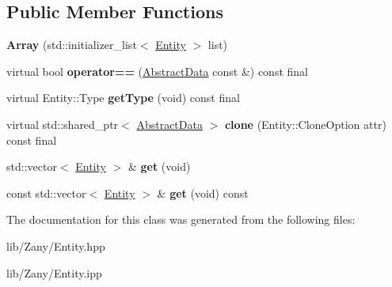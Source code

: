 \subsection*{Public Member Functions}
\begin{DoxyCompactItemize}
\item 
\mbox{\label{classzany_1_1_array_a212f89a1e77b6822880a61e0154e9821}} 
{\bfseries Array} (std\+::initializer\+\_\+list$<$ \hyperlink{classzany_1_1_entity}{Entity} $>$ list)
\item 
\mbox{\label{classzany_1_1_array_a0dc13166b5668856e8133b11ea801204}} 
virtual bool {\bfseries operator==} (\hyperlink{classzany_1_1_abstract_data}{Abstract\+Data} const \&) const final
\item 
\mbox{\label{classzany_1_1_array_a5e28b4da092baae2bd8ecb611e379110}} 
virtual Entity\+::\+Type {\bfseries get\+Type} (void) const final
\item 
\mbox{\label{classzany_1_1_array_a39a6b3fed75600f400d73bba1c2fbed5}} 
virtual std\+::shared\+\_\+ptr$<$ \hyperlink{classzany_1_1_abstract_data}{Abstract\+Data} $>$ {\bfseries clone} (Entity\+::\+Clone\+Option attr) const final
\item 
\mbox{\label{classzany_1_1_array_a9a3620cc53ae2270dc9883dc3ef566d2}} 
std\+::vector$<$ \hyperlink{classzany_1_1_entity}{Entity} $>$ \& {\bfseries get} (void)
\item 
\mbox{\label{classzany_1_1_array_a07d22c675fdbdd36c9c9698e28d340e1}} 
const std\+::vector$<$ \hyperlink{classzany_1_1_entity}{Entity} $>$ \& {\bfseries get} (void) const
\end{DoxyCompactItemize}


The documentation for this class was generated from the following files\+:\begin{DoxyCompactItemize}
\item 
lib/\+Zany/Entity.\+hpp\item 
lib/\+Zany/Entity.\+ipp\end{DoxyCompactItemize}
